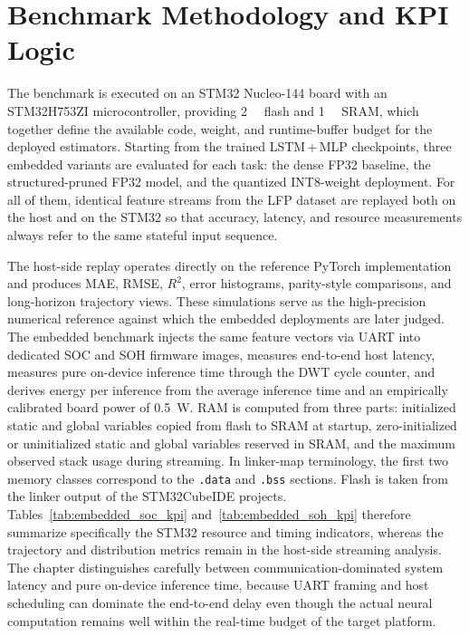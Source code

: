 \documentclass[
    a4paper,
    12pt,
    titlepage,
    bibliography=totoc,
    twoside=on,
    parskip=false,
    numbers=noenddot,
    cleardoublepage=empty,
    DIV=12,
    BCOR=12.0mm,
    headheight=36pt,
    headings=openright
]{scrreprt}
\begin{document}
\section{Benchmark Methodology and KPI Logic}
The benchmark is executed on an STM32 Nucleo-144 board with an STM32H753ZI microcontroller, providing \SI{2}{\mega\byte} flash and \SI{1}{\mega\byte} SRAM, which together define the available code, weight, and runtime-buffer budget for the deployed estimators.\autocite{STM32Nucleo144Boards2025_Datasheet,naguibMicroprocessorExecutionTime2022} Starting from the trained LSTM\,+\,MLP checkpoints, three embedded variants are evaluated for each task: the dense FP32 baseline, the structured-pruned FP32 model, and the quantized INT8-weight deployment. For all of them, identical feature streams from the LFP dataset are replayed both on the host and on the STM32 so that accuracy, latency, and resource measurements always refer to the same stateful input sequence.

The host-side replay operates directly on the reference PyTorch implementation and produces MAE, RMSE, $R^2$, error histograms, parity-style comparisons, and long-horizon trajectory views. These simulations serve as the high-precision numerical reference against which the embedded deployments are later judged. The embedded benchmark injects the same feature vectors via UART into dedicated SOC and SOH firmware images, measures end-to-end host latency, measures pure on-device inference time through the DWT cycle counter, and derives energy per inference from the average inference time and an empirically calibrated board power of \SI{0.5}{\watt}. RAM is computed from three parts: initialized static and global variables copied from flash to SRAM at startup, zero-initialized or uninitialized static and global variables reserved in SRAM, and the maximum observed stack usage during streaming. In linker-map terminology, the first two memory classes correspond to the \texttt{.data} and \texttt{.bss} sections. Flash is taken from the linker output of the STM32CubeIDE projects. Tables~\ref{tab:embedded_soc_kpi} and~\ref{tab:embedded_soh_kpi} therefore summarize specifically the STM32 resource and timing indicators, whereas the trajectory and distribution metrics remain in the host-side streaming analysis. The chapter distinguishes carefully between communication-dominated system latency and pure on-device inference time, because UART framing and host scheduling can dominate the end-to-end delay even though the actual neural computation remains well within the real-time budget of the target platform.
\end{document}
